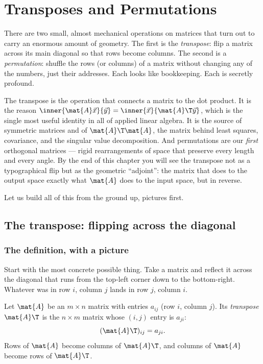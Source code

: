 \chapter{Transposes and Permutations}

There are two small, almost mechanical operations on matrices that turn out to carry an
enormous amount of geometry. The first is the \emph{transpose}: flip a matrix across its main
diagonal so that rows become columns. The second is a \emph{permutation}: shuffle the rows (or
columns) of a matrix without changing any of the numbers, just their addresses. Each looks
like bookkeeping. Each is secretly profound.

The transpose is the operation that connects a matrix to the dot product. It is the reason
$\inner{\mat{A}\vec{x}}{\vec{y}} = \inner{\vec{x}}{\mat{A}\T\vec{y}}$, which is the single most
useful identity in all of applied linear algebra. It is the source of symmetric matrices and of
$\mat{A}\T\mat{A}$, the matrix behind least squares, covariance, and the singular value
decomposition. And permutations are our \emph{first} orthogonal matrices --- rigid rearrangements
of space that preserve every length and every angle. By the end of this chapter you will see the
transpose not as a typographical flip but as the geometric ``adjoint'': the matrix that does to the
output space exactly what $\mat{A}$ does to the input space, but in reverse.

Let us build all of this from the ground up, pictures first.

\section{The transpose: flipping across the diagonal}

\subsection{The definition, with a picture}

Start with the most concrete possible thing. Take a matrix and reflect it across the diagonal that
runs from the top-left corner down to the bottom-right. Whatever was in row $i$, column $j$ lands in
row $j$, column $i$.

\begin{definition}[Transpose]\label{ch10:def-transpose}
Let $\mat{A}$ be an $m\times n$ matrix with entries $a_{ij}$ (row $i$, column $j$). Its
\emph{transpose} $\mat{A}\T$ is the $n\times m$ matrix whose $(i,j)$ entry is $a_{ji}$:
\[
  (\mat{A}\T)_{ij} = a_{ji}.
\]
Rows of $\mat{A}$ become columns of $\mat{A}\T$, and columns of $\mat{A}$ become rows of $\mat{A}\T$.
\end{definition}

